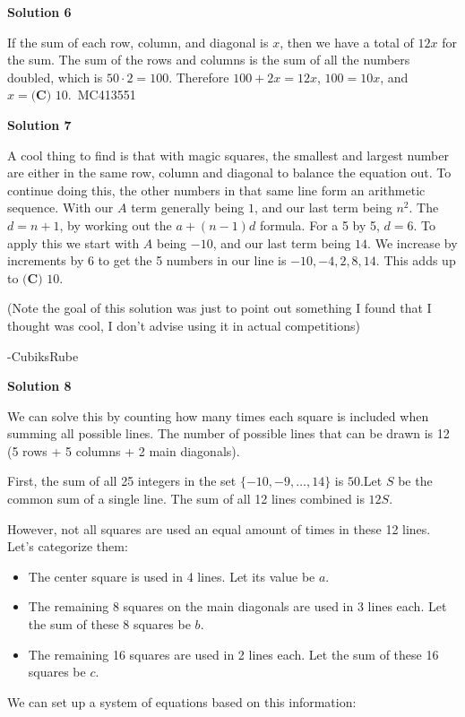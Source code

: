 \begin{enumerate}
\textbf{Solution 6}

If the sum of each row, column, and diagonal is $x$, then we have a total of $12x$ for the sum. The sum of the rows and columns is the sum of all the numbers doubled, which is $50\cdot2=100$. Therefore $100+2x=12x$, $100=10x$, and $x=\boxed {\textbf {(C) }10}$.~MC413551

 



\textbf{Solution 7}

A cool thing to find is that with magic squares, the smallest and largest number are either in the same row, column and diagonal to balance the equation out. To continue doing this, the other numbers in that same line form an arithmetic sequence. With our $A$ term generally being $1$, and our last term being $n^2$. The $d = n+1$, by working out the $a+(n-1)d$ formula. For a 5 by 5, $d = 6$. To apply this we start with $A$ being $-10$, and our last term being $14$. We increase by increments by $6$ to get the 5 numbers in our line is $-10, -4, 2, 8, 14$. This adds up to $\boxed {\textbf {(C) }10}$.

 (Note the goal of this solution was just to point out something I found that I thought was cool, I don't advise using it in actual competitions)

 -CubiksRube

 



\textbf{Solution 8}

We can solve this by counting how many times each square is included when summing all possible lines. The number of possible lines that can be drawn is 12 (5 rows + 5 columns + 2 main diagonals).

 First, the sum of all 25 integers in the set $\{-10, -9, \dots, 14\}$ is $50$.Let $S$ be the common sum of a single line. The sum of all 12 lines combined is $12S$.

 However, not all squares are used an equal amount of times in these 12 lines. Let's categorize them:

 
            \begin{itemize}
        \item The center square is used in 4 lines. Let its value be $a$.
        \item The remaining 8 squares on the main diagonals are used in 3 lines each. Let the sum of these 8 squares be $b$.
        \item The remaining 16 squares are used in 2 lines each. Let the sum of these 16 squares be $c$.
            \end{itemize}
            We can set up a system of equations based on this information:


\end{enumerate}
